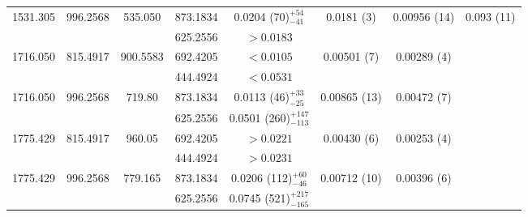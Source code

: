 \begin{landscape}
\begin{longtable}{c|c|c|c|c|c|c|c}
        1531.305 & 996.2568 & 535.050 & 873.1834 & 0.0204 (70)$^{+54}_{-41}$ & 0.0181 (3) & 0.00956 (14) & 0.093 (11)  \\
        & & & 625.2556 & $>0.0183$ & & & \\ \hline
        1716.050 & 815.4917 & 900.5583 &  692.4205 & $<0.0105$ & 0.00501 (7) & 0.00289 (4) &  \\
        & & & 444.4924 & $<0.0531$ & & &  \\ \hline
        1716.050 & 996.2568 & 719.80 & 873.1834 & 0.0113 (46)$^{+33}_{-25}$ & 0.00865 (13) & 0.00472 (7) & \\
        &  &  & 625.2556 & 0.0501 (260)$^{+147}_{-113}$ & & &  \\ \hline
        1775.429 & 815.4917 & 960.05 &  692.4205 & $>0.0221$ & 0.00430 (6) & 0.00253 (4) &  \\
        &  &  & 444.4924 & $>0.0231$ & & &  \\ \hline
        1775.429 & 996.2568 & 779.165 & 873.1834 & 0.0206 (112)$^{+60}_{-46}$ & 0.00712 (10) & 0.00396 (6) & \\
        &  &  & 625.2556 & 0.0745 (521)$^{+217}_{-165}$	& & & \\
        \bottomrule
    \end{longtable}
\end{landscape}